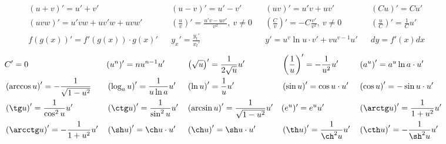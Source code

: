 



\small
\setlength{\abovedisplayskip}{0pt}
\setlength{\belowdisplayskip}{0pt}
\setlength{\abovedisplayshortskip}{0pt}
\setlength{\belowdisplayshortskip}{0pt}
\setlength{\parindent}{0pt}

\begin{align*}
	& (u+v)'=u'+v' & & (u-v)'=u'-v' & & (uv)'=u'v+uv' &  & (Cu)'=Cu'\\
	& (uvw)'=u'vw+uv'w+uvw' & & \left(\frac{u}{v}\right)' =\frac{u'v-uv'}{v^2},\ v\neq 0 & & \left(\frac{C}{v}\right)'=-C\frac{v'}{v^2},\ v\neq 0 & & \left(\frac{u}{C}\right)'=\frac{1}{C}u'\\
	& f(g(x))' = f'(g(x))\cdot g(x)' & & y_x'=\frac{y_t'}{x_t'} & & y'=u^v\ln u\cdot v'+vu^{v-1}u' & & dy = f'(x)dx
\end{align*}
\begin{align*}
	& C'=0 & & (u^n)'=nu^{n-1}u' & & \left(\sqrt{u}\right)'=\frac{1}{2\sqrt{u}}u' & & \left(\frac{1}{u}\right)'=-\frac{1}{u^2}u' & & \left(a^u\right)'=a^u\ln a\cdot u' \\
	& \left(\arccos u\right)'= -\frac{1}{\sqrt{1-u^2}} & & \left(\log_au\right)'=\frac{1}{u\ln a} u' & & \left(\ln u\right)'=\frac{1}{u}u' & & \left(\sin u\right)'=\cos u\cdot u' & & \left(\cos u\right)'=-\sin u\cdot u'\\
	& \left(\tg u\right)' = \frac{1}{\cos^2u}u' & &\left(\ctg u\right)' = \frac{1}{\sin^2u}u' & & \left(\arcsin u\right)' = \frac{1}{\sqrt{1-u^2}}u' & & (e^u)'=e^uu' & & \left(\arctg u\right)' = \frac{1}{1+u^2}u'\\
	& \left(\arcctg u\right)'=-\frac{1}{1+u^2}u' & & \left(\sh u\right)' = \ch u \cdot u' & & \left(\ch u\right)' = \sh u\cdot u' & & \left(\th u\right)' = \frac{1}{\ch^2u}u' & & \left(\cth u\right)' = -\frac{1}{\sh^2u}u'
\end{align*}


